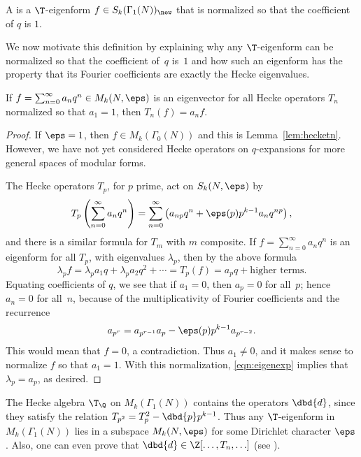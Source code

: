 \begin{definition}[Newform]\label{def:newform}
A  is a $\T$-eigenform $f\in S_k(\Gamma_1(N))_{\new}$
that is normalized so that the coefficient of $q$ is $1$.
\end{definition}
We now motivate this definition by explaining why any $\T$-eigenform
can be normalized so that the coefficient of~$q$ is~$1$ and how such
an eigenform has the property that its Fourier
coefficients are exactly the Hecke eigenvalues.
\begin{proposition}\label{prop:eigncoeffs}
If $f=\sum_{n=0}^{\infty} a_n q^n \in M_k(N,\eps)$ 
is an eigenvector for all Hecke operators
$T_n$ normalized so that $a_1=1$, 
then $T_n(f) = a_n f$.
\end{proposition}
\begin{proof}
If $\eps=1$, then $f\in M_k(\Gamma_0(N))$ and this
is Lemma~\ref{lem:hecketn}.   However, we have not
yet considered Hecke operators on $q$-expansions for
more general spaces of modular forms. 

The Hecke operators $T_p$, for $p$ prime, act on $S_k(N,\eps)$
by 
$$
T_p\left(\sum_{n=0}^{\infty} a_n q^n\right) =
\sum_{n=0}^{\infty} \left( a_{np}q^n + \eps(p) p^{k-1}
  a_{n}q^{np}\right),
$$
and there is a similar formula for $T_m$ with $m$ composite.
If $f=\sum_{n=0}^{\infty} a_n q^n$ is an eigenform for all
$T_p$, with eigenvalues $\lambda_p$, then by the above formula 
\begin{equation}\label{eqn:eigenexp}
\lambda_p f = \lambda_p a_1 q + \lambda_p a_2 q^2 + \cdots = T_p(f) = a_{p} q +
\text{higher terms}.  
\end{equation}
Equating coefficients of $q$, we see that if
$a_1=0$, then $a_p=0$ for all~$p$; hence
$a_n=0$ for all~$n$, because of the multiplicativity of Fourier
coefficients and the recurrence $$a_{p^r} = a_{p^{r-1}} a_p - \eps(p)
p^{k-1} a_{p^{r-2}}.$$ 
This would mean that $f=0$, a contradiction.  Thus $a_1\neq 0$,
and it makes sense to normalize $f$ so that $a_1=1$.
With this normalization, \eqref{eqn:eigenexp} implies that $\lambda_p = a_p$,
as desired.  
\end{proof}

\begin{remark}\label{rem:dbdinhecke}
  The Hecke algebra $\T_\Q$ on $M_k(\Gamma_1(N))$ contains the
  operators $\dbd{d}$, since they satisfy the relation $T_{p^2} =
  T_p^2 - \dbd{p}p^{k-1}$.  Thus any $\T$-eigenform in
  $M_k(\Gamma_1(N))$ lies in a subspace $M_k(N,\eps)$ for some
  Dirichlet character $\eps$. Also, one can even prove that
  $\dbd{d} \in \Z[\ldots,T_n,\ldots]$ (see
  ).
\end{remark}

